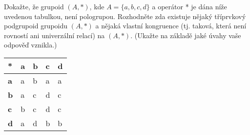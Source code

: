 Dokažte, že grupoid $(A, *)$, kde $A = \{a,b,c,d\}$ a operátor * je dána níže
uvedenou tabulkou, není pologrupou.  Rozhodněte zda existuje nějaký tříprvkový
podgrupoid grupoidu $(A, *)$ a nějaká vlastní kongruence (tj. taková, která není
rovností ani univerzální relací) na $(A, *)$. (Ukažte na základě jaké úvahy vaše
odpověď vznikla.)

\begin{table}[h]
\centering
\begin{tabular}{|l|l|l|l|l|}
\hline
*          & \textbf{a} & \textbf{b} & \textbf{c} & \textbf{d} \\ \hline
\textbf{a} & a          & b          & a          & a          \\ \hline
\textbf{b} & a          & c          & d          & c          \\ \hline
\textbf{c} & b          & c          & d          & c          \\ \hline
\textbf{d} & a          & d          & b          & b          \\ \hline
\end{tabular}
\end{table}
